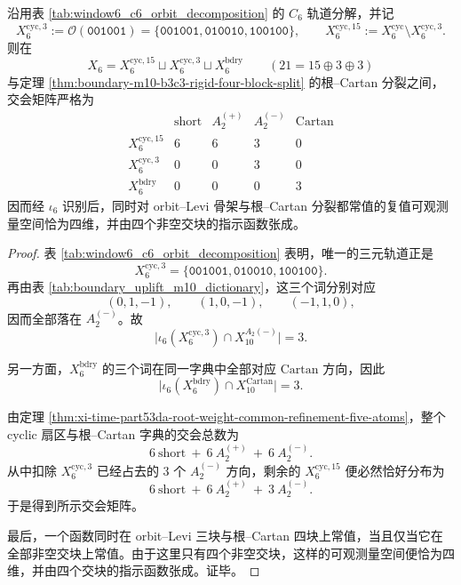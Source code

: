 \begin{theorem}\label{thm:xi-time-part53da-orbit-levi-root-cartan-intersection}
沿用表 \ref{tab:window6_c6_orbit_decomposition} 的 \(C_6\) 轨道分解，并记
\[
X^{\mathrm{cyc},3}_6:=\mathcal{O}(\texttt{001001})
=
\{\texttt{001001},\texttt{010010},\texttt{100100}\},
\qquad
X^{\mathrm{cyc},15}_6:=X_6^{\mathrm{cyc}}\setminus X^{\mathrm{cyc},3}_6.
\]
则在
\[
X_6=X^{\mathrm{cyc},15}_6\sqcup X^{\mathrm{cyc},3}_6\sqcup X_6^{\mathrm{bdry}}
\qquad (21=15\oplus 3\oplus 3)
\]
与定理 \ref{thm:boundary-m10-b3c3-rigid-four-block-split} 的根--Cartan 分裂之间，交会矩阵严格为
\[
\begin{array}{c|cccc}
& \mathrm{short} & A_2^{(+)} & A_2^{(-)} & \mathrm{Cartan}\\
\hline
X^{\mathrm{cyc},15}_6 & 6 & 6 & 3 & 0\\
X^{\mathrm{cyc},3}_6  & 0 & 0 & 3 & 0\\
X_6^{\mathrm{bdry}}   & 0 & 0 & 0 & 3
\end{array}
\]
因而经 \(\iota_6\) 识别后，同时对 orbit--Levi 骨架与根--Cartan 分裂都常值的复值可观测量空间恰为四维，并由四个非空交块的指示函数张成。
\end{theorem}
\begin{proof}
表 \ref{tab:window6_c6_orbit_decomposition} 表明，唯一的三元轨道正是
\[
X^{\mathrm{cyc},3}_6
=
\{\texttt{001001},\texttt{010010},\texttt{100100}\}.
\]
再由表 \ref{tab:boundary_uplift_m10_dictionary}，这三个词分别对应
\[
(0,1,-1),\qquad (1,0,-1),\qquad (-1,1,0),
\]
因而全部落在 \(A_2^{(-)}\)。故
\[
\bigl|\iota_6(X^{\mathrm{cyc},3}_6)\cap X_{10}^{A_2(-)}\bigr|=3.
\]

另一方面，\(X_6^{\mathrm{bdry}}\) 的三个词在同一字典中全部对应 \(\mathrm{Cartan}\) 方向，因此
\[
\bigl|\iota_6(X_6^{\mathrm{bdry}})\cap X_{10}^{\mathrm{Cartan}}\bigr|=3.
\]

由定理 \ref{thm:xi-time-part53da-root-weight-common-refinement-five-atoms}，整个 cyclic 扇区与根--Cartan 字典的交会总数为
\[
6\ \mathrm{short}\ +\ 6\ A_2^{(+)}\ +\ 6\ A_2^{(-)}.
\]
从中扣除 \(X^{\mathrm{cyc},3}_6\) 已经占去的 \(3\) 个 \(A_2^{(-)}\) 方向，剩余的 \(X^{\mathrm{cyc},15}_6\) 便必然恰好分布为
\[
6\ \mathrm{short}\ +\ 6\ A_2^{(+)}\ +\ 3\ A_2^{(-)}.
\]
于是得到所示交会矩阵。

最后，一个函数同时在 orbit--Levi 三块与根--Cartan 四块上常值，当且仅当它在全部非空交块上常值。由于这里只有四个非空交块，这样的可观测量空间便恰为四维，并由四个交块的指示函数张成。证毕。
\end{proof}

